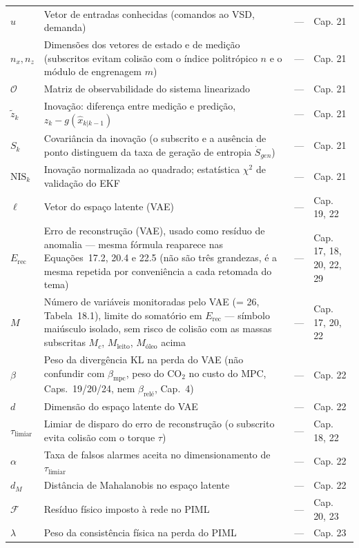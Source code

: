 \documentclass[12pt,a4paper]{article}
\numberwithin{equation}{section}
\numberwithin{table}{section}
\numberwithin{figure}{section}
\begin{document}
{{\begin{longtable}{>{\raggedright\arraybackslash}p{2.8cm} >{\raggedright\arraybackslash}p{5.3cm} >{\raggedright\arraybackslash}p{2.1cm} >{\raggedright\arraybackslash}p{4.2cm}}
	$u$ & Vetor de entradas conhecidas (comandos ao VSD, demanda) & --- & Cap. 21 \\
	$n_x, n_z$\dag & Dimensões dos vetores de estado e de medição (subscritos evitam colisão com o índice politrópico $n$ e o módulo de engrenagem $m$) & --- & Cap. 21 \\
	$\mathcal{O}$ & Matriz de observabilidade do sistema linearizado & --- & Cap. 21 \\
	$\tilde{z}_k$ & Inovação: diferença entre medição e predição, $z_k - g(\hat{x}_{k|k-1})$ & --- & Cap. 21 \\
	$S_k$\dag & Covariância da inovação (o subscrito e a ausência de ponto distinguem da taxa de geração de entropia $\dot{S}_{gen}$) & --- & Cap. 21 \\
	$\text{NIS}_k$ & Inovação normalizada ao quadrado; estatística $\chi^2$ de validação do EKF & --- & Cap. 21 \\
	$\ell$\dag & Vetor do espaço latente (VAE) & --- & Cap. 19, 22 \\
	$E_{\text{rec}}$ & Erro de reconstrução (VAE), usado como resíduo de anomalia — mesma fórmula reaparece nas Equações~17.2, 20.4 e 22.5 (não são três grandezas, é a mesma repetida por conveniência a cada retomada do tema) & --- & Cap. 17, 18, 20, 22, 29 \\
	$M$ & Número de variáveis monitoradas pelo VAE (= 26, Tabela~18.1), limite do somatório em $E_{\text{rec}}$ — símbolo maiúsculo isolado, sem risco de colisão com as massas subscritas $M_c$, $M_{\text{leito}}$, $M_{\text{óleo}}$ acima & --- & Cap. 17, 20, 22 \\
	$\beta$ & Peso da divergência KL na perda do VAE (não confundir com $\beta_{\text{mpc}}$, peso do CO$_2$ no custo do MPC, Caps.~19/20/24, nem $\beta_{\text{relé}}$, Cap.~4) & --- & Cap. 22 \\
	$d$ & Dimensão do espaço latente do VAE & --- & Cap. 22 \\
	$\tau_{\text{limiar}}$\dag & Limiar de disparo do erro de reconstrução (o subscrito evita colisão com o torque $\tau$) & --- & Cap. 18, 22 \\
	$\alpha$ & Taxa de falsos alarmes aceita no dimensionamento de $\tau_{\text{limiar}}$ & --- & Cap. 22 \\
	$d_M$ & Distância de Mahalanobis no espaço latente & --- & Cap. 22 \\
	$\mathcal{F}$ & Resíduo físico imposto à rede no PIML & --- & Cap. 20, 23 \\
	$\lambda$ & Peso da consistência física na perda do PIML & --- & Cap. 23 \\

\end{longtable}}}
\end{document}
